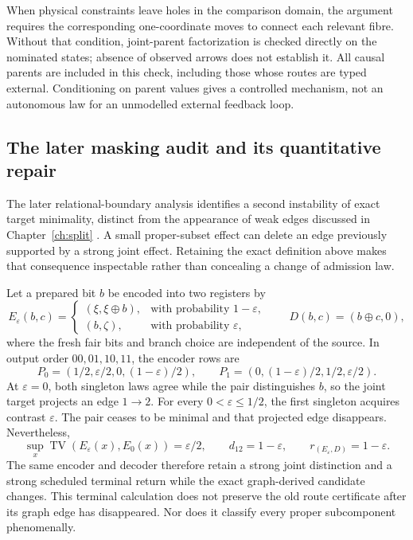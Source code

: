 When physical constraints leave holes in the comparison domain, the
argument requires the corresponding one-coordinate moves to connect
each relevant fibre. Without that condition, joint-parent factorization
is checked directly on the nominated states; absence of observed arrows
does not establish it. All causal parents are included in this check,
including those whose routes are typed external. Conditioning on parent
values gives a controlled mechanism, not an autonomous law for an
unmodelled external feedback loop.


\subsection{The later masking audit and its quantitative repair}
\label{sec:update-masking}
The later relational-boundary analysis identifies a second instability of exact target minimality, distinct from the appearance of weak edges discussed in Chapter~\ref{ch:split} \cite{RodgersBoundaries2026}. A small proper-subset effect can delete an edge previously supported by a strong joint effect. Retaining the exact definition above makes that consequence inspectable rather than concealing a change of admission law.

Let a prepared bit $b$ be encoded into two registers by
\[
E_\varepsilon(b,c)=
\begin{cases}
(\xi,\xi\oplus b),&\text{with probability }1-\varepsilon,\\
(b,\zeta),&\text{with probability }\varepsilon,
\end{cases}
\qquad D(b,c)=(b\oplus c,0),
\]
where the fresh fair bits and branch choice are independent of the source. In output order $00,01,10,11$, the encoder rows are
\[
P_0=(1/2,\varepsilon/2,0,(1-\varepsilon)/2),\qquad
P_1=(0,(1-\varepsilon)/2,1/2,\varepsilon/2).
\]
At $\varepsilon=0$, both singleton laws agree while the pair distinguishes $b$, so the joint target projects an edge $1\to2$. For every $0<\varepsilon\le1/2$, the first singleton acquires contrast $\varepsilon$. The pair ceases to be minimal and that projected edge disappears. Nevertheless,
\[
\sup_x\operatorname{TV}(E_\varepsilon(x),E_0(x))=\varepsilon/2,
\qquad d_{12}=1-\varepsilon,
\qquad r_{(E_\varepsilon,D)}=1-\varepsilon.
\]
The same encoder and decoder therefore retain a strong joint distinction and a strong scheduled terminal return while the exact graph-derived candidate changes. This terminal calculation does not preserve the old route certificate after its graph edge has disappeared. Nor does it classify every proper subcomponent phenomenally.

